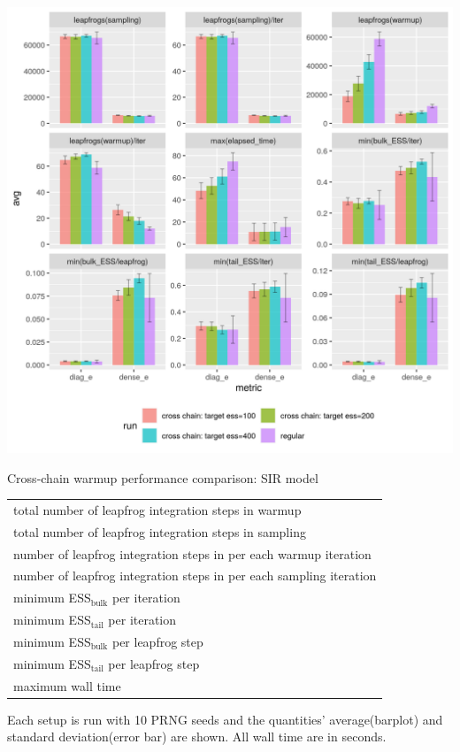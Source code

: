 \documentclass[landscape,a0paper,fontscale=0.5]{baposter} %
\newenvironment{ColFigure}
  {\par\medskip\noindent\minipage{\linewidth}}
  {\endminipage\par\medskip}
\begin{document}
\begin{poster}
{\begin{multicols}{2}
\begin{ColFigure}
\centering
\includegraphics[width=0.8\linewidth]{./figure/cross_chain_ess_effect_sir.png}
\caption{Cross-chain warmup performance comparison: SIR model}
\end{ColFigure}

\begin{center}
\begin{tabular}{l}
\hline
total number of leapfrog integration steps in warmup \\
total number of leapfrog integration steps in sampling \\
number of leapfrog integration steps in per each warmup iteration \\
number of leapfrog integration steps in per each sampling iteration \\
minimum ESS\(_{\text{bulk}}\) per iteration \\
minimum ESS\(_{\text{tail}}\) per iteration \\
minimum ESS\(_{\text{bulk}}\) per leapfrog step \\
minimum ESS\(_{\text{tail}}\) per leapfrog step \\
maximum wall time
\hline
\end{tabular}
\end{center}
Each setup is run with 10 PRNG seeds and the quantities' average(barplot)
and standard deviation(error bar) are shown. All wall time are in seconds.




\end{multicols}}
\end{poster}
\end{document}
